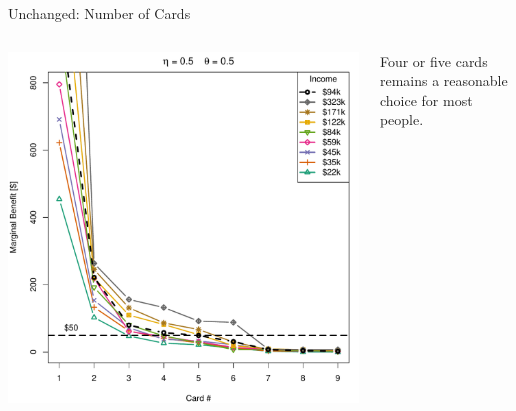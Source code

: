 \begin{frame}{Unchanged: Number of Cards}
    \begin{columns}[c]
        \begin{column}{0.7\textwidth}
            \includegraphics[width=0.9\textheight]{../Figures/MBvsKvsIncome_05_05.pdf}
        \end{column}
        \begin{column}{0.3\textwidth}
            \centering
            Four or five cards remains a reasonable choice for most people.
        \end{column}
    \end{columns}
\end{frame} 


